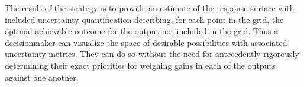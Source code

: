 \documentclass{article}
\begin{document}
%

%
The result of the strategy is to provide an estimate of the response surface with included uncertainty quantification describing, for each point in the grid, the optimal achievable outcome for the output not included in the grid.
%
Thus a decisionmaker can visualize the space of desirable possibilities with associated uncertainty metrics. 
%
They can do so without the need for antecedently rigorously determining their exact priorities for weighing gains in each of the outputs against one another.
\end{document}
